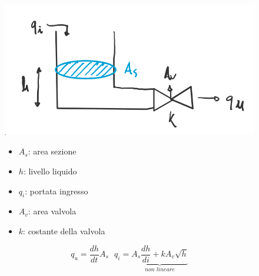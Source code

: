 	\begin{figure}[H]
		\begin{minipage}{.3\textwidth}
			\centering
			\includegraphics[width=0.9\linewidth]{"Images/serbatoioconvalvola.png"}
		\end{minipage}%
		\begin{minipage}{.3\textwidth}
			\begin{itemize}
				\item $ A_s $: area sezione
				\item $ h $: livello liquido
				\item $ q_i $: portata ingresso
				\item $ A_v $: area valvola
				\item $ k $: costante della valvola
			\end{itemize}
		\end{minipage}
		\begin{minipage}{.3\textwidth}
			\centering
			\begin{equation*}
				\boxed{q_u = \frac{dh}{dt}A_s}\text{  }q_i = \underbrace{A_s \dfrac{dh}{di} + k A_v \sqrt{h}}_{\textit{non lineare}}
			\end{equation*}
		\end{minipage}
	\end{figure}
